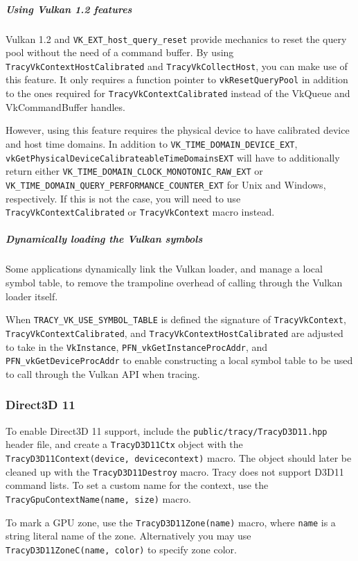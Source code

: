 \documentclass[hidelinks,titlepage,a4paper,twoside]{article}
\begin{document}
\subparagraph{Using Vulkan 1.2 features}

Vulkan 1.2 and \texttt{VK\_EXT\_host\_query\_reset} provide mechanics to reset the query pool without the need of a command buffer. By using \texttt{TracyVkContextHostCalibrated} and \texttt{TracyVkCollectHost}, you can make use of this feature. It only requires a function pointer to \texttt{vkResetQueryPool} in addition to the ones required for \texttt{TracyVkContextCalibrated} instead of the VkQueue and VkCommandBuffer handles.

However, using this feature requires the physical device to have calibrated device and host time domains. In addition to \texttt{VK\_TIME\_DOMAIN\_DEVICE\_EXT}, \texttt{vkGetPhysicalDeviceCalibrateableTimeDomainsEXT} will have to additionally return either \texttt{VK\_TIME\_DOMAIN\_CLOCK\_MONOTONIC\_RAW\_EXT} or \texttt{VK\_TIME\_DOMAIN\_QUERY\_PERFORMANCE\_COUNTER\_EXT} for Unix and Windows, respectively. If this is not the case, you will need to use \texttt{TracyVkContextCalibrated} or \texttt{TracyVkContext} macro instead.

\subparagraph{Dynamically loading the Vulkan symbols}

Some applications dynamically link the Vulkan loader, and manage a local symbol table, to remove the trampoline overhead of calling through the Vulkan loader itself.

When \texttt{TRACY\_VK\_USE\_SYMBOL\_TABLE} is defined the signature of \texttt{TracyVkContext}, \texttt{TracyVkContextCalibrated}, and \texttt{TracyVkContextHostCalibrated} are adjusted to take in the \texttt{VkInstance}, \texttt{PFN\_vkGetInstanceProcAddr}, and \texttt{PFN\_vkGetDeviceProcAddr} to enable constructing a local symbol table to be used to call through the Vulkan API when tracing.

\subsubsection{Direct3D 11}

To enable Direct3D 11 support, include the \texttt{public/tracy/TracyD3D11.hpp} header file, and create a \texttt{TracyD3D11Ctx} object with the \texttt{TracyD3D11Context(device, devicecontext)} macro. The object should later be cleaned up with the \texttt{TracyD3D11Destroy} macro. Tracy does not support D3D11 command lists. To set a custom name for the context, use the \texttt{TracyGpuContextName(name, size)} macro.

To mark a GPU zone, use the \texttt{TracyD3D11Zone(name)} macro, where \texttt{name} is a string literal name of the zone. Alternatively you may use \texttt{TracyD3D11ZoneC(name, color)} to specify zone color.
\end{document}
